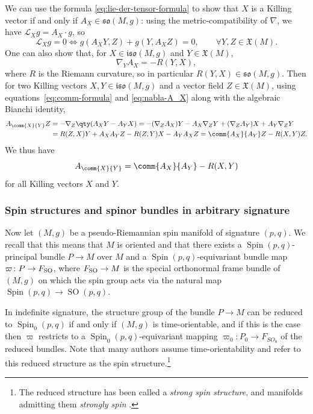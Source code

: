 \documentclass[pdftex]{sigma}
\numberwithin{equation}{section}
\newcommand{\fso}{\mathfrak{so}}
\newcommand{\fiso}{\mathfrak{iso}}
\newcommand{\fX}{\mathfrak{X}}
\newcommand{\eL}{\mathscr{L}}
\newcommand{\1}{\mathbbm{1}}
\DeclareMathOperator{\Spin}{Spin}
\DeclareMathOperator{\SO}{SO}
\begin{document}
We can use the formula \eqref{eq:lie-der-tensor-formula} to show that $X$ is a Killing vector if and only if $A_X\in\fso(M,g)$: using the metric-compatibility of $\nabla$, we have $\eL_X g = A_X\cdot g$, so
\begin{equation}\label{eq:killing-condition}
	\eL_X g = 0 \iff g(A_X Y, Z) + g(Y,A_X Z) = 0,\qquad\forall Y,Z\in\fX(M).
\end{equation}
One can also show \cite[Lemma~2.2]{Kostant1955} that, for $X\in\fiso(M,g)$ and $Y\in\fX(M)$,
\begin{equation}\label{eq:nabla-A_X}
	\nabla_Y A_X = -R(Y,X),
\end{equation}
where $R$ is the Riemann curvature, so in particular $R(Y,X)\in\fso(M,g)$. Then for two Killing vectors $X,Y\in\fiso(M,g)$ and a vector field $Z\in\fX(M)$, using equations~\eqref{eq:comm-formula} and \eqref{eq:nabla-A_X} along with the algebraic Bianchi identity,
\begin{align*}
	A_{\comm{X}{Y}}Z
		&= -\nabla_Z\qty(A_X Y - A_Y X)= -(\nabla_ZA_X)Y - A_X\nabla_ZY + (\nabla_ZA_Y)X + A_Y\nabla_ZY\\
		&= R(Z,X)Y + A_XA_YZ - R(Z,Y)X- A_YA_XZ= \comm{A_X}{A_Y}Z - R(X,Y)Z.
\end{align*}
We thus have
\begin{equation}\label{eq:A-comm}
	A_{\comm{X}{Y}} = \comm{A_X}{A_Y} - R(X,Y)
\end{equation}
for all Killing vectors $X$ and $Y$.

\subsubsection{Spin structures and spinor bundles in arbitrary signature}
\label{sec:spin-structures}

Now let $(M,g)$ be a pseudo-Riemannian spin manifold of signature $(p,q)$. We recall that this means that $M$ is oriented and that there exists a $\Spin(p,q)$-principal bundle $P\to M$ over $M$ and a $\Spin(p,q)$-equivariant bundle map $\varpi\colon P\to F_{\rm SO}$, where $F_{\rm SO}\to M$ is the special orthonormal frame bundle of $(M,g)$ on which the spin group acts via the natural map $\Spin(p,q)\to\SO(p,q)$.

In indefinite signature, the structure group of the bundle $P\to M$ can be reduced to $\Spin_0(p,q)$ if and only if $(M,g)$ is time-orientable, and if this is the case then $\varpi$ restricts to a $\Spin_0(p,q)$-equivariant mapping $\varpi_0\colon P_0\to F_{SO_0}$ of the reduced bundles. Note that many authors assume time-orientability and refer to this reduced structure as the spin structure.\footnote{The reduced structure has been called a \emph{strong spin structure}, and manifolds admitting them \emph{strongly spin} \cite{Cortes2021,Shahbazi2024_2,Shahbazi2024_1}.}
	
\end{document}
